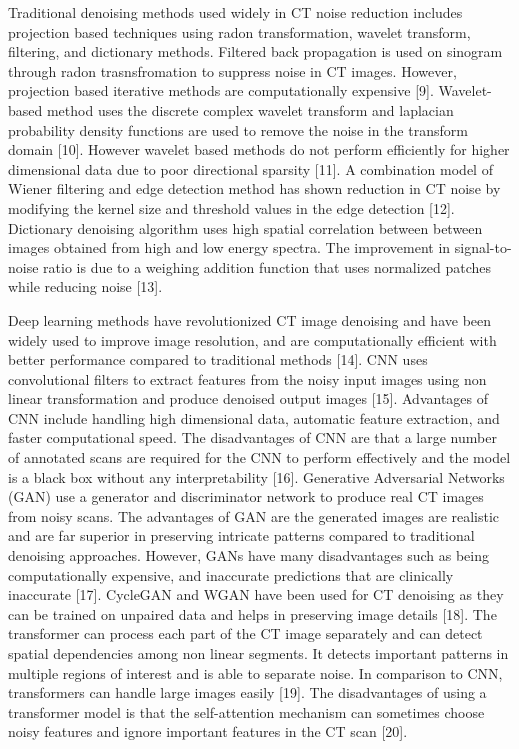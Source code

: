 \documentclass{article}
\begin{document}
\begin{par}
    Traditional denoising methods used widely in CT noise reduction includes projection based techniques using radon transformation, wavelet transform, filtering, and dictionary methods. Filtered back propagation is used on sinogram through radon trasnsfromation to suppress noise in CT images. However, projection based iterative methods are computationally expensive [9]. Wavelet-based method uses the discrete complex wavelet transform and laplacian probability density functions are used to remove the noise in the transform domain [10]. However wavelet based methods do not perform efficiently for higher dimensional data due to poor directional sparsity [11]. A combination   model of  Wiener filtering and edge detection method has shown reduction in CT noise by modifying the kernel size and  threshold values in the edge detection [12].
    Dictionary denoising algorithm uses high spatial correlation between between images obtained from high and low energy spectra. The improvement in signal-to-noise ratio is due to a weighing addition function that uses normalized patches while reducing noise [13]. 
\end{par}

\begin{par}
    Deep learning methods have revolutionized CT image denoising and have been widely used to improve image resolution, and are computationally efficient with better performance compared to traditional methods [14]. CNN uses convolutional filters to extract features from the noisy input images using non linear transformation and produce denoised output images [15]. Advantages of CNN include handling high dimensional data, automatic feature extraction, and faster computational speed. The disadvantages of CNN are that a large number of annotated scans are required for the CNN to perform effectively and the model is a  black box without any interpretability [16]. Generative Adversarial Networks (GAN) use a generator and discriminator network to produce real CT images from noisy scans. The advantages of GAN are the generated images are realistic and are far superior in preserving intricate patterns compared to traditional denoising approaches. However, GANs have many disadvantages such as being computationally expensive, and inaccurate predictions that are clinically inaccurate [17]. CycleGAN and WGAN have been used for CT denoising as they can be trained on unpaired data and helps in preserving image details [18]. The  transformer can process each part of the CT image separately and can detect spatial dependencies among non linear segments. It detects important patterns in multiple regions of interest and is able to separate noise. In comparison to CNN, transformers can handle large images easily [19]. The disadvantages of using a transformer model is that the self-attention mechanism can sometimes choose noisy features and ignore important features in the CT scan [20]. 
\end{par}
\end{document}
